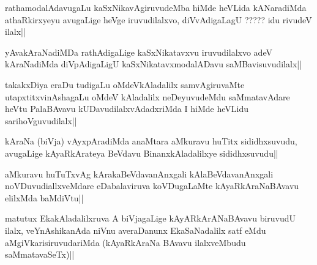 \begin{artha}
rathamodalAdavugaLu kaSxNikavAgiruvudeMba hiMde heVLida kANaradiMda athaRkirxyeyu avugaLige heVge iruvudilalxvo, diVvAdigaLagU ????? idu rivudeV ilalx||
\end{artha}

\begin{artha}
yAvakAraNadiMDa rathAdigaLige kaSxNikatavxvu iruvudilalxvo adeV kAraNadiMda diVpAdigaLigU kaSxNikatavxmodalADavu saMBavisuvudilalx||
\end{artha}

\begin{artha}
takakxDiya eraDu tudigaLu oMdeVkAladalilx samvAgiruvaMte utapxtitxvinAshagaLu oMdeV kAladalilx neDeyuvudeMdu saMmatavAdare heVtu PalaBAvavu kUDavudilalxvAdadxriMda I hiMde heVLidu sarihoVguvudilalx||
\end{artha}

\begin{artha}
kAraNa (biVja) vAyxpAradiMda anaMtara aMkuravu huTitx sididhxsuvudu, avugaLige kAyaRkArateya BeVdavu BinanxkAladalilxye sididhxsuvudu||
\end{artha}

\begin{artha}
aMkuravu huTuTxvAg kArakaBeVdavanAnxgali kAlaBeVdavanAnxgali noVDuvudiallxveMdare eDabalaviruva koVDugaLaMte kAyaRkAraNaBAvavu elilxMda baMdiVtu||
\end{artha}

\begin{artha}
matutux EkakAladalilxruva A biVjagaLige kAyARkArANaBAvavu biruvudU ilalx, veYnAshikanAda niVnu averaDanunx EkaSaNadalilx satf eMdu aMgiVkarisiruvudariMda (kAyaRkAraNa BAvavu ilalxveMbudu saMmatavaSeTx)||
\end{artha}


